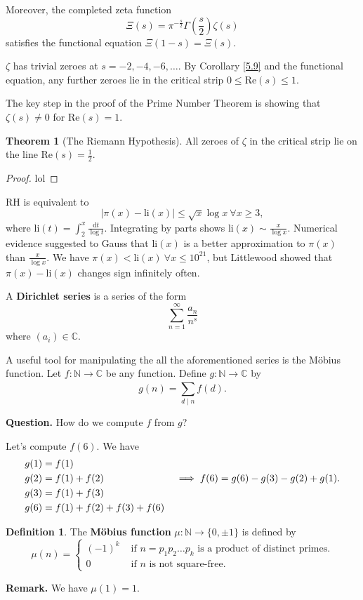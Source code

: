 \documentclass{article}
\theoremstyle{definition}
\newtheorem{theorem}{Theorem}[section]
\newtheorem{defn}{Definition}[section]
\begin{document}
Moreover, the completed zeta function \[
\Xi(s)=\pi^{-\frac{s}{2}} \Gamma \left(\frac{s}{2}\right)\zeta(s)
\] satisfies the functional equation $\Xi(1-s)=\Xi(s)$.
\vspace{1mm}

$\zeta$ has trivial zeroes at $s=-2,-4,-6,\ldots$. By Corollary \ref{5.9} and the functional equation, any further zeroes lie in the critical strip $0\le \text{Re}(s)\le 1$.

The key step in the proof of the Prime Number Theorem is showing that $\zeta(s) \neq 0$ for $\text{Re}(s)=1$.

\begin{theorem}[The Riemann Hypothesis]
    All zeroes of $\zeta$ in the critical strip lie on the line $\text{Re}(s)=\frac{1}{2}$.
\end{theorem}
\begin{proof}
    lol
\end{proof}
RH is equivalent to $$|\pi(x)-\text{li}(x)|\le \sqrt{x}\log x ~\forall x\ge 3,$$ where $\text{li}(t)=\int_{2}^{x} \frac{\mathrm{d}t}{\log t}$. Integrating by parts shows $\text{li}(x) \sim\frac{x}{\log x}$. Numerical evidence suggested to Gauss that $\text{li}(x)$ is a better approximation to $\pi(x)$ than $\frac{x}{\log x}$. We have $\pi(x)<\text{li}(x) ~\forall x \le 10^{21}$, but Littlewood showed that $\pi(x)-\text{li}(x)$ changes sign infinitely often.
\vspace{1mm}

A \textbf{Dirichlet series} is a series of the form $$\sum_{n=1}^{\infty} \frac{a_n}{n^s}$$ where $(a_i) \in \mathbb{C}$. 

A useful tool for manipulating the all the aforementioned series is the Möbius function. Let $f: \mathbb{N} \to \mathbb{C}$ be any function. Define $g : \mathbb{N} \to \mathbb{C}$ by $$g(n)=\sum_{d \mid n}^{} f(d).$$

\textbf{Question.} How do we compute $f$ from $g$?

Let's compute $f(6)$. We have 
\begin{align*}
    &g(1)=f(1)\\
    &g(2)=f(1)+f(2) \hspace{25mm} \implies f(6)=g(6)-g(3)-g(2)+g(1).\\
    &g(3)=f(1)+f(3)\\
    &g(6)=f(1)+f(2)+f(3)+f(6)
\end{align*}
\begin{defn}
    The \textbf{Möbius function} $\mu : \mathbb{N} \to \{0,\pm 1\}$ is defined by 
    \[
    \mu(n) = \begin{cases}
        (-1)^k &\text{ if } n=p_1p_2\ldots p_k \text{ is a product of distinct primes.}\\
        0 &\text{ if }n \text{ is not square-free.}
    \end{cases}
    \]
\end{defn}
\textbf{Remark.} We have $\mu(1)=1$.
\vspace{1mm}
\end{document}

